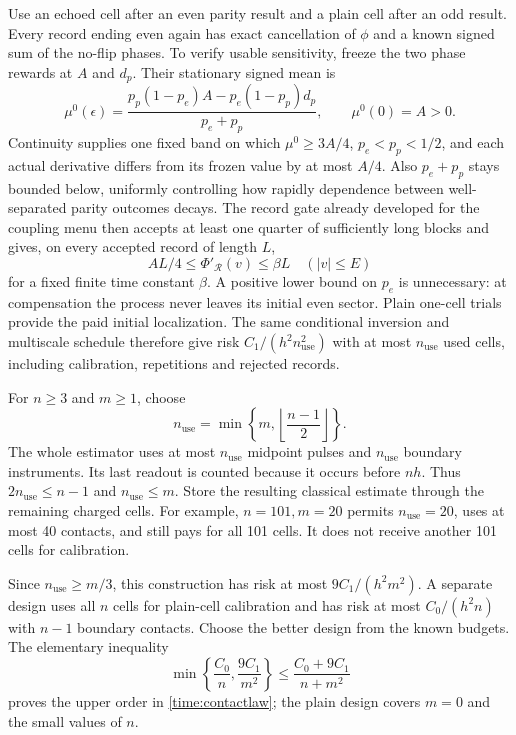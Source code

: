 \documentclass[11pt,a4paper]{article}
\numberwithin{equation}{section}
\theoremstyle{remark}
\begin{document}
Use an echoed cell after an even parity result and a plain cell after an odd
result. Every record ending even again has exact cancellation of $\phi$ and
a known signed sum of the no-flip phases. To verify usable sensitivity,
freeze the two phase rewards at $A$ and $d_p$. Their stationary signed mean is
\begin{equation}
 \mu^0(\epsilon)=
 \frac{p_p(1-p_e)A-p_e(1-p_p)d_p}{p_e+p_p},
 \qquad \mu^0(0)=A>0.
\end{equation}
Continuity supplies one fixed band on which $\mu^0\ge3A/4$,
$p_e<p_p<1/2$, and each actual derivative differs from its frozen value by at
most $A/4$. Also $p_e+p_p$ stays bounded below, uniformly controlling how
rapidly dependence between well-separated parity outcomes decays.
The record gate already developed for the coupling menu then accepts at least
one quarter of sufficiently long blocks and gives, on every accepted record
of length $L$,
\begin{equation}
 AL/4\le \Phi'_{\mathcal R}(v)\le \beta L
 \quad (|v|\le E)
\end{equation}
for a fixed finite time constant $\beta$. A positive lower bound on $p_e$
is unnecessary: at compensation the process never leaves its initial even
sector. Plain
one-cell trials provide the paid initial localization. The same conditional
inversion and multiscale schedule therefore give risk $C_1/(h^2n_{\mathrm{use}}^2)$ with
at most $n_{\mathrm{use}}$ used cells, including calibration, repetitions and rejected
records.

For $n\ge3$ and $m\ge1$, choose
\begin{equation}
 n_{\mathrm{use}}=\min\!\left\{m,\left\lfloor\frac{n-1}{2}\right\rfloor\right\}.
 \label{time:allocation}
\end{equation}
The whole estimator uses at most $n_{\mathrm{use}}$ midpoint pulses and $n_{\mathrm{use}}$ boundary
instruments. Its last readout is counted because it occurs before $nh$.
Thus $2n_{\mathrm{use}}\le n-1$ and $n_{\mathrm{use}}\le m$. Store the resulting classical estimate
through the remaining charged cells. For example, $n=101,m=20$ permits
$n_{\mathrm{use}}=20$, uses at most 40 contacts, and still pays for all 101 cells. It does
not receive another 101 cells for calibration.

Since $n_{\mathrm{use}}\ge m/3$, this construction has risk at most
$9C_1/(h^2m^2)$. A separate design uses all $n$ cells for plain-cell
calibration and has risk at most $C_0/(h^2n)$ with $n-1$ boundary contacts.
Choose the better design from the known budgets. The elementary inequality
\begin{equation}
 \min\!\left\{\frac{C_0}{n},\frac{9C_1}{m^2}\right\}
 \le \frac{C_0+9C_1}{n+m^2}
\end{equation}
proves the upper order in \eqref{time:contactlaw}; the plain design covers
$m=0$ and the small values of $n$.
\end{document}
